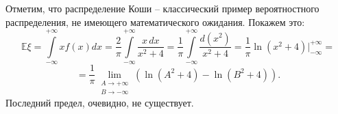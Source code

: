 \documentclass[12pt]{article}
\begin{document}
Отметим, что распределение Коши -- классический пример вероятностного распределения, не имеющего математического ожидания. Покажем это:
\begin{equation*}
    \mathbb{E}\xi = \int\limits_{-\infty}^{+\infty} xf(x)dx = \frac{2}{\pi} \int\limits_{-\infty}^{+\infty} \frac{x\,dx}{x^2 + 4} = \frac{1}{\pi} \int\limits_{-\infty}^{+\infty} \frac{d(x^2)}{x^2 + 4} = \frac{1}{\pi} \ln(x^2+4) \bigg|_{-\infty}^{+\infty} = 
\end{equation*}
\begin{equation*}
    = \frac{1}{\pi} \lim_{\substack{A\rightarrow +\infty\\ B\rightarrow -\infty}} (\ln(A^2+4) - \ln(B^2 + 4)).
\end{equation*}
Последний предел, очевидно, не существует.
\end{document}
